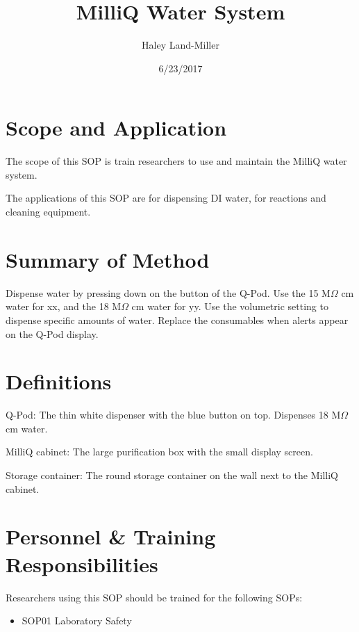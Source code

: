 \documentclass[12pt]{../SOP3_beta}
\title{MilliQ Water System}
\date{6/23/2017}
\author{Haley Land-Miller}
\begin{document}


\maketitle

\section{Scope and Application}

\NP The scope of this SOP is train researchers to use and maintain the MilliQ water system.

\NP The applications of this SOP are for dispensing DI water, for reactions and cleaning equipment. 

\section{Summary of Method}

\NP Dispense water by pressing down on the button of the Q-Pod. Use the 15 M$\Omega$ cm water for xx, and the 18 M$\Omega$ cm water for yy. Use the volumetric setting to dispense specific amounts of water. Replace the consumables when alerts appear on the Q-Pod display. 

\tableofcontents

\newpage

\section{Definitions}

\NP Q-Pod: The thin white dispenser with the blue button on top. Dispenses 18 M$\Omega$ cm water. 

\NP MilliQ cabinet: The large purification box with the small display screen.

\NP Storage container: The round storage container on the wall next to the MilliQ cabinet.

\section{Personnel \& Training Responsibilities}

\NP Researchers using this SOP should be trained for the following SOPs:

\begin{itemize}
  \item SOP01 Laboratory Safety
\end{itemize}
\end{document}

